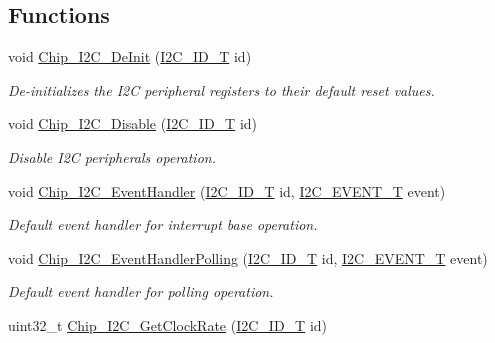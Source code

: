 \subsection*{Functions}
\begin{DoxyCompactItemize}
\item 
void \hyperlink{group__I2C__17XX__40XX_ga334c2c12edda443a7e949a1ea4a6a646}{Chip\+\_\+\+I2\+C\+\_\+\+De\+Init} (\hyperlink{group__I2C__17XX__40XX_ga957556a4d900506cd4cba8427afd81e6}{I2\+C\+\_\+\+I\+D\+\_\+T} id)
\begin{DoxyCompactList}\small\item\em De-\/initializes the I2C peripheral registers to their default reset values. \end{DoxyCompactList}\item 
void \hyperlink{group__I2C__17XX__40XX_ga68f1d630224edab35ba796373c5867c0}{Chip\+\_\+\+I2\+C\+\_\+\+Disable} (\hyperlink{group__I2C__17XX__40XX_ga957556a4d900506cd4cba8427afd81e6}{I2\+C\+\_\+\+I\+D\+\_\+T} id)
\begin{DoxyCompactList}\small\item\em Disable I2C peripheral\textquotesingle{}s operation. \end{DoxyCompactList}\item 
void \hyperlink{group__I2C__17XX__40XX_ga06b84fe3fad7ffd4ccb93f2683781936}{Chip\+\_\+\+I2\+C\+\_\+\+Event\+Handler} (\hyperlink{group__I2C__17XX__40XX_ga957556a4d900506cd4cba8427afd81e6}{I2\+C\+\_\+\+I\+D\+\_\+T} id, \hyperlink{group__I2C__17XX__40XX_gacb2cd4e03ea48339d327e4f387441bf3}{I2\+C\+\_\+\+E\+V\+E\+N\+T\+\_\+T} event)
\begin{DoxyCompactList}\small\item\em Default event handler for interrupt base operation. \end{DoxyCompactList}\item 
void \hyperlink{group__I2C__17XX__40XX_gaaa89a66d658a41325b3c5e56bc059401}{Chip\+\_\+\+I2\+C\+\_\+\+Event\+Handler\+Polling} (\hyperlink{group__I2C__17XX__40XX_ga957556a4d900506cd4cba8427afd81e6}{I2\+C\+\_\+\+I\+D\+\_\+T} id, \hyperlink{group__I2C__17XX__40XX_gacb2cd4e03ea48339d327e4f387441bf3}{I2\+C\+\_\+\+E\+V\+E\+N\+T\+\_\+T} event)
\begin{DoxyCompactList}\small\item\em Default event handler for polling operation. \end{DoxyCompactList}\item 
uint32\+\_\+t \hyperlink{group__I2C__17XX__40XX_ga6b13511432337d21b8cd325651cc5b63}{Chip\+\_\+\+I2\+C\+\_\+\+Get\+Clock\+Rate} (\hyperlink{group__I2C__17XX__40XX_ga957556a4d900506cd4cba8427afd81e6}{I2\+C\+\_\+\+I\+D\+\_\+T} id)

\end{DoxyCompactItemize}
